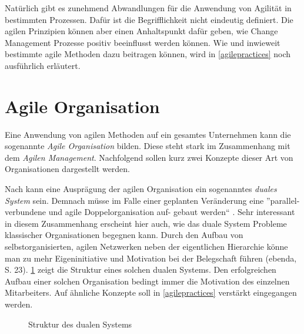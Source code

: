

Natürlich gibt es zunehmend Abwandlungen für die Anwendung von Agilität in bestimmten Prozessen. Dafür ist die Begrifflichkeit nicht eindeutig definiert. Die agilen Prinzipien können aber einen Anhaltspunkt dafür geben, wie Change Management Prozesse positiv  beeinflusst werden können. Wie und inwieweit bestimmte agile Methoden dazu beitragen können, wird in \ref{agilepractices} noch ausführlich erläutert.

\todots

\section{Agile Organisation}
\label{background:agileorganisation}

Eine Anwendung von agilen Methoden auf ein gesamtes Unternehmen kann die sogenannte \textit{Agile Organisation} bilden. Diese steht stark im Zusammenhang mit  dem \textit{Agilen Management}. Nachfolgend sollen kurz zwei Konzepte dieser Art von Organisationen dargestellt werden.

Nach  kann eine Ausprägung der agilen Organisation ein sogenanntes \textit{duales System} sein. Demnach müsse im Falle einer geplanten Veränderung eine ''parallel-verbundene und agile Doppelorganisation auf- gebaut werden`` \cite[S. 22]{deeken_agiles_2018}. Sehr interessant in diesem Zusammenhang erscheint hier auch, wie das duale System Probleme klassischer Organisationen begegnen kann. Durch den Aufbau von selbstorganisierten, agilen Netzwerken neben der eigentlichen Hierarchie könne man zu mehr Eigeninitiative und Motivation bei der Belegschaft  führen (ebenda, S. 23). \ref{fig:dualessystem} zeigt die Struktur eines solchen dualen Systems. Den erfolgreichen Aufbau einer solchen Organisation bedingt immer die Motivation des einzelnen Mitarbeiters. Auf ähnliche Konzepte soll in \ref{agilepractices} verstärkt eingegangen werden.  

 \begin{figure}
	\centering
	\caption[Struktur des dualen Systems]{Struktur des dualen Systems \protect \cite[S. 23]{deeken_agiles_2018}}
	\label{fig:dualessystem}
\end{figure}

